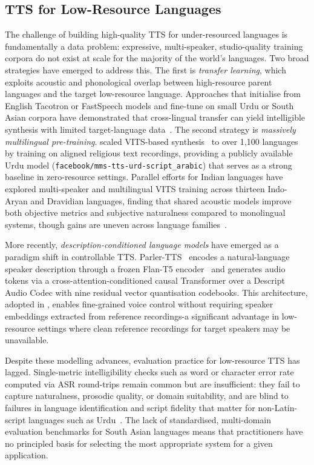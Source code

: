 \documentclass[a4paper,fleqn]{cas-dc}
\begin{document}
    
    \subsection{TTS for Low-Resource Languages}\label{sec:related-lowresource}
    
    The challenge of building high-quality TTS for under-resourced languages is fundamentally a data problem: expressive, multi-speaker, studio-quality training corpora do not exist at scale for the majority of the world's languages. Two broad strategies have emerged to address this. The first is \emph{transfer learning}, which exploits acoustic and phonological overlap between high-resource parent languages and the target low-resource language. Approaches that initialise from English Tacotron or FastSpeech models and fine-tune on small Urdu or South Asian
    corpora have demonstrated that cross-lingual transfer can yield intelligible synthesis with limited target-language data~\citep{jamal2022transfer}. The second strategy is \emph{massively multilingual pre-training}. \citet{pratap2023mms} scaled VITS-based synthesis~\citep{kim2021vits} to over 1{,}100 languages by training on aligned religious text recordings, providing a publicly available Urdu model (\texttt{facebook/\-mms-\-tts-\-urd-\-script\_arabic}) that serves as a strong baseline in zero-resource settings. Parallel efforts for Indian languages have explored multi-speaker and multilingual VITS training across thirteen Indo-Aryan and Dravidian languages, finding that shared acoustic models improve both objective metrics and subjective naturalness compared to monolingual systems, though gains are uneven across language families~\citep{kumar2023indic}.
    
    More recently, \emph{description-conditioned language models} have emerged as a
    paradigm shift in controllable TTS. Parler-TTS~\citep{lyth2024natural,lacombe2024parlertts}
    encodes a natural-language speaker description through a frozen
    Flan-T5 encoder~\citep{chung2022flan} and generates audio tokens via a
    cross-attention-conditioned causal Transformer over a Descript Audio Codec with
    nine residual vector quantisation codebooks. This architecture, adopted in
    , enables fine-grained voice control without
    requiring speaker embeddings extracted from reference recordings-a significant
    advantage in low-resource settings where clean reference recordings for target
    speakers may be unavailable.
    
    Despite these modelling advances, evaluation practice for low-resource TTS has
    lagged. Single-metric intelligibility checks such as word or character error rate
    computed via ASR round-trips remain common but are insufficient: they fail to
    capture naturalness, prosodic quality, or domain suitability, and are blind to
    failures in language identification and script fidelity that matter for non-Latin-script
    languages such as Urdu~\citep{rahman2026pashto}. The lack of standardised,
    multi-domain evaluation benchmarks for South Asian languages means that
    practitioners have no principled basis for selecting the most appropriate system
    for a given application.
    
\end{document}
